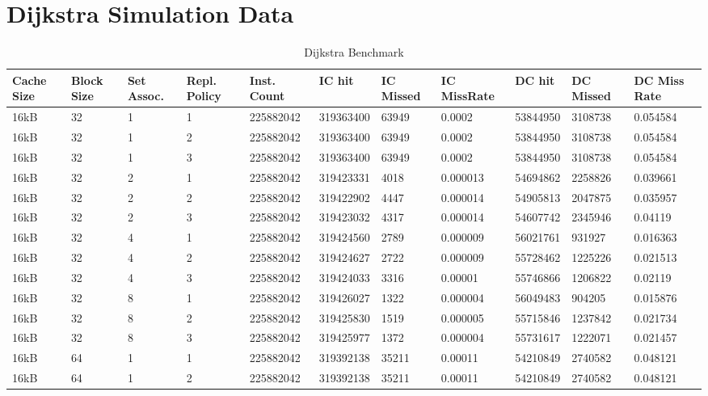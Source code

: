 \documentclass[conference]{IEEEtran}
\begin{document}
\section{Dijkstra Simulation Data}
    \begin{table}
      \caption{Dijkstra Benchmark}
      \centering
        \begin{tabular}{|m{.75cm} |m{.75cm} |m{.8cm} | m{.75cm} | l | l | l | l | l | l | l |}
          \hline
          \textbf{Cache Size} & \textbf{ Block Size} & \textbf{Set Assoc.} & \textbf{Repl. Policy} & \textbf{Inst. Count} & \textbf{IC hit} & \textbf{IC Missed} & \textbf{IC MissRate} & \textbf{DC hit} & \textbf{DC Missed} & \textbf{DC Miss Rate} \\ \hline
          
          										
16kB&	32&	1&	1&	225882042&	319363400&	63949 &0.0002	 & 53844950	  &3108738	&0.054584 \\ \hline
16kB&	32&	1&	2&	225882042&	319363400&	63949 &0.0002	 & 53844950	  &3108738	&0.054584 \\ \hline
16kB&	32&	1&	3&	225882042&	319363400&	63949 &0.0002	 & 53844950	  &3108738	&0.054584 \\ \hline
16kB&	32&	2&	1&	225882042&	319423331&	4018  &0.000013&	54694862	&2258826	&0.039661 \\ \hline
16kB&	32&	2&	2&	225882042&	319422902&	4447  &0.000014&	54905813	&2047875	&0.035957 \\ \hline
16kB&	32&	2&	3&	225882042&	319423032&	4317  &0.000014&	54607742	&2345946	&0.04119  \\ \hline
16kB&	32&	4&	1&	225882042&	319424560&	2789  &0.000009&	56021761	&931927	  &0.016363 \\ \hline
16kB&	32&	4&	2&	225882042&	319424627&	2722  &0.000009&	55728462	&1225226	&0.021513 \\ \hline
16kB&	32&	4&	3&	225882042&	319424033&	3316  &0.00001	&  55746866 &	1206822	&0.02119  \\ \hline
16kB&	32&	8&	1&	225882042&	319426027&	1322  &0.000004&	56049483	&904205	  &0.015876 \\ \hline
16kB&	32&	8&	2&	225882042&	319425830&	1519  &0.000005&	55715846	&1237842	&0.021734 \\ \hline
16kB&	32&	8&	3&	225882042&	319425977&	1372  &0.000004&	55731617	&1222071	&0.021457 \\ \hline
16kB&	64&	1&	1&	225882042&	319392138&	35211 &0.00011	&  54210849 &	2740582	&0.048121 \\ \hline
16kB&	64&	1&	2&	225882042&	319392138&	35211 &0.00011	&  54210849 &	2740582	&0.048121 \\ \hline

\end{tabular}
\end{table}
\end{document}

